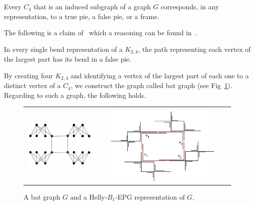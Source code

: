 

\begin{lemma}\label{lem:representacaoC4}
Every  $C_4$ that is an induced subgraph of a graph $ G $ corresponds, in any representation, to a true pie, a false pie, or a frame.
\end{lemma}

The following is a claim of~\cite{heldt2014} which a reasoning can be found in~\cite{Asinowski2009}.

\begin{lemma}\label{fact:k24facts}
In every single bend representation of a $K_{2,4}$, the path representing each vertex of the largest part has its bend in a false pie.
\end{lemma} %

By creating four $K_{2,4}$ and identifying a vertex of the largest part of each one to a distinct vertex of a $C_4$, we construct the graph called bat graph (see Fig~\ref{fig:grafoQ}). Regarding to such a graph, the following holds.

\begin{figure}[htb]
  \centering
  \begin{tabular}{c c c c c }
    \includegraphics[width=5.5cm]{./img/Qexemplo}    
    & &
   \includegraphics[width=8cm]{./img/representationQ}
  \end{tabular}
  \caption{A bat graph $G$ and a Helly-$B_1$-EPG representation of $G$.}\label{fig:grafoQ}
\end{figure} 

